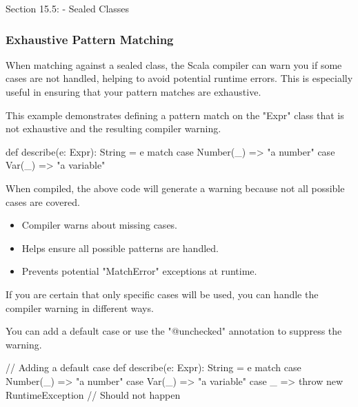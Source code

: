 \begin{notes}{Section 15.5: - Sealed Classes}
\begin{highlight}
    \end{highlight}
    
    \subsubsection*{Exhaustive Pattern Matching}
    
    When matching against a sealed class, the Scala compiler can warn you if some cases are not handled, helping to avoid potential runtime errors. This is especially useful in ensuring that your pattern matches are exhaustive.
    
    \begin{highlight}
    
        This example demonstrates defining a pattern match on the "Expr" class that is not exhaustive and the resulting compiler warning.
    
    \begin{code}[Scala]
    def describe(e: Expr): String = e match {
        case Number(_) => "a number"
        case Var(_) => "a variable"
    }
    \end{code}
    
        When compiled, the above code will generate a warning because not all possible cases are covered.
        
        \begin{itemize}
            \item Compiler warns about missing cases.
            \item Helps ensure all possible patterns are handled.
            \item Prevents potential "MatchError" exceptions at runtime.
        \end{itemize}
    
    \end{highlight}
    
    If you are certain that only specific cases will be used, you can handle the compiler warning in different ways.
    
    \begin{highlight}
    
        You can add a default case or use the "@unchecked" annotation to suppress the warning.
    
    \begin{code}[Scala]
    // Adding a default case
    def describe(e: Expr): String = e match {
        case Number(_) => "a number"
        case Var(_) => "a variable"
        case _ => throw new RuntimeException // Should not happen
    }
    

\end{code}
\end{highlight}
\end{notes}
